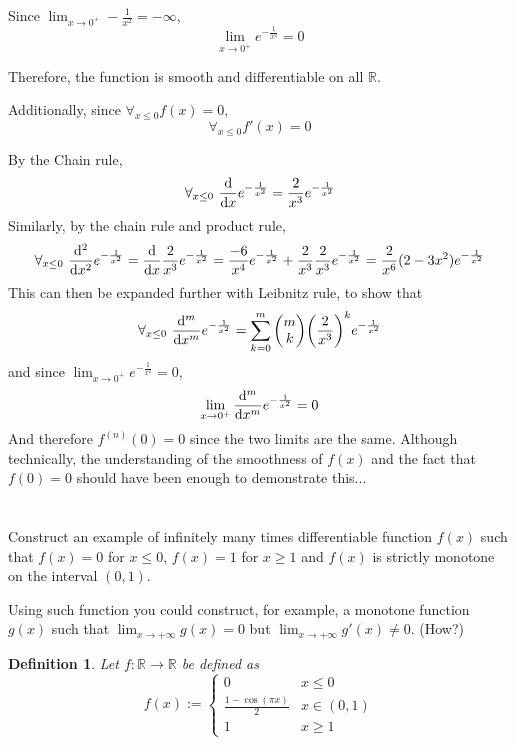 \documentclass[]{article}
\newcommand{\R}{\mathbb{R}}
\newtheorem{definition}{Definition}
\begin{document}
Since $\lim_{x \to 0^+} - \frac{1}{x^2} = - \infty$,
\[
    \lim_{x \to 0^+} e^{-\frac{1}{x^2}} = 0
\]

Therefore, the function is smooth and differentiable on all $\R$.

Additionally, since $\forall_{x \leq 0} f(x) = 0$,
\[
    \forall_{x \leq 0} f'(x) = 0
\]

By the Chain rule,
\[
    \forall_{x \leq 0} \ \dv{x} e^{- \frac{1}{x^2}} = \frac{2}{x^3} e^{-\frac{1}{x^2}}
\]
Similarly, by the chain rule and product rule,
\[
    \forall_{x \leq 0} \ \dv[2]{x} e^{- \frac{1}{x^2}} 
    = \dv{x} \frac{2}{x^3} e^{-\frac{1}{x^2}}
    = \frac{-6}{x^4} e^{-\frac{1}{x^2}} + \frac{2}{x^3} \frac{2}{x^3} e^{-\frac{1}{x^2}}
    = \frac{2}{x^6} (2 - 3 x^2) e^{-\frac{1}{x^2}}
\]
This can then be expanded further with Leibnitz rule,
to show that 
\[
    \forall_{x \leq 0} \ \dv[m]{x} e^{- \frac{1}{x^2}}
    = \sum_{k = 0}^m \mqty(m \\ k) \qty(\frac{2}{x^3})^k e^{-\frac{1}{x^2}}
\]
and since $\lim_{x \to 0^+} e^{-\frac{1}{x^2}} = 0$,
\[
    \lim_{x \to 0^+} \dv[m]{x} e^{- \frac{1}{x^2}} = 0
\]
And therefore $f^{(n)}(0) = 0$ since the two limits are the same. 
Although technically, the understanding of the smoothness of $f(x)$ and the fact that $f(0) = 0$ should have been enough to demonstrate this...

\newpage
\section{}
Construct an example of infinitely many times differentiable function $f(x)$ such that $f(x) = 0$ for $x \leq 0$, $f(x) = 1$ for $x \geq 1$ and $f(x)$ is strictly monotone on the interval $(0,1)$.

Using such function you could construct, for example, a monotone function $g(x)$ such that $\lim_{x \to +\infty} g(x) = 0$ but $\lim_{x \to +\infty} g'(x) \neq 0$. (How?)

\begin{definition}
    Let $f : \R \to \R$ be defined as
    \[
        f(x) := \begin{cases}
            0   &x \leq 0\\
            \frac{1 - \cos(\pi x)}{2} & x \in (0,1)\\
            1   &x \geq 1
        \end{cases}
    \]   
\end{definition}
\end{document}
